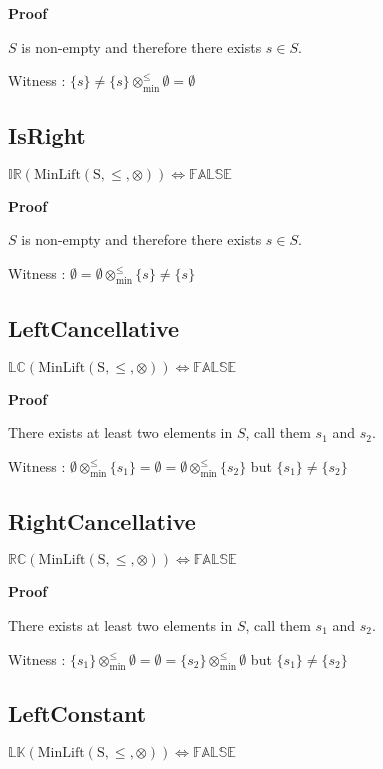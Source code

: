 \documentclass[10pt]{article}
\newcommand{\propname}[1]{{\mathbb{#1}}}
\newcommand{\minlift}{\otimes_{\min}^{\leq}}
\newcommand{\proof}{\vspace{1em} \textbf{Proof} \vspace{1em}}
\begin{document}
\proof

$S$ is non-empty and therefore there exists $s \in S$.

\vspace{0.5em}

Witness : $\{s\} \neq \{s\} \minlift \emptyset = \emptyset$



\subsection{IsRight}
$\propname{IR}(\mathrm{MinLift(S,\leq,\otimes)}) \Leftrightarrow \propname{FALSE}$

\proof

$S$ is non-empty and therefore there exists $s \in S$.

\vspace{0.5em}

Witness : $\emptyset = \emptyset \minlift \{s\} \neq \{s\}$



\subsection{LeftCancellative}
$\propname{LC}(\mathrm{MinLift(S,\leq,\otimes)}) \Leftrightarrow \propname{FALSE}$

\proof

There exists at least two elements in $S$, call them $s_1$ and $s_2$.

\vspace{0.5em}

Witness : $\emptyset \minlift \{s_1\} = \emptyset = \emptyset \minlift \{s_2\} $ but $\{s_1\} \neq \{s_2\}$



\subsection{RightCancellative}
$\propname{RC}(\mathrm{MinLift(S,\leq,\otimes)}) \Leftrightarrow \propname{FALSE}$

\proof

There exists at least two elements in $S$, call them $s_1$ and $s_2$.

\vspace{0.5em}

Witness : $\{s_1\} \minlift \emptyset = \emptyset = \{s_2\} \minlift \emptyset$ but $\{s_1\} \neq \{s_2\}$



\subsection{LeftConstant}
$\propname{LK}(\mathrm{MinLift(S,\leq,\otimes)}) \Leftrightarrow \propname{FALSE}$
\end{document}
